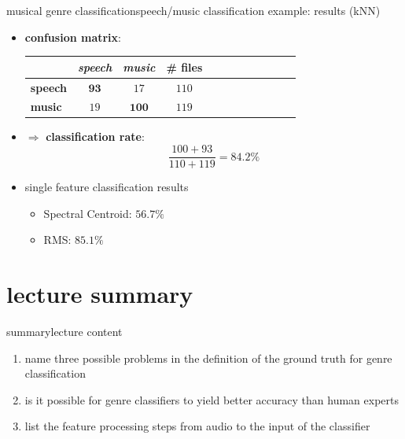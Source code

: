         \begin{frame}{musical genre classification}{speech/music classification example: results (kNN)}
            \begin{itemize}
                \item   \textbf{confusion matrix}:
                    \begin{table}
                        \centering
                        \begin{tabular}{l|cc|ccccccccc} %
                            \bf{\emph{}}	 & \bf{\emph{speech}}	 & \bf{\emph{music}} & \# files	 \\ 
                             \hline
                            \bf{speech}	 & $\mathbf{93}$	 & $17$	 & $110$\\
                            \bf{music}	 & $19$	 & $\mathbf{100}$ & $119$
                        \end{tabular}
                    \end{table}
                \item<2->$\Rightarrow$ \textbf{classification rate}: 
                    \begin{equation*}
                        \frac{100 + 93}{110 + 119} = 84.2\%
                    \end{equation*}
                \smallskip
                \item<3->   single feature classification results
                    \begin{itemize}
                        \item	Spectral Centroid: $56.7\%$
                        \item	RMS: $85.1\%$
                    \end{itemize}
            \end{itemize}
        \end{frame}


    \section[summary]{lecture summary}
        \begin{frame}{summary}{lecture content}
            \begin{enumerate}
                \item   name three possible problems in the definition of the ground truth for genre classification
                \smallskip
                \item<2->   is it possible for genre classifiers to yield better accuracy than human experts
                \smallskip
                \item<3->   list the feature processing steps from audio to the input of the classifier
            \end{enumerate}
        \end{frame}


